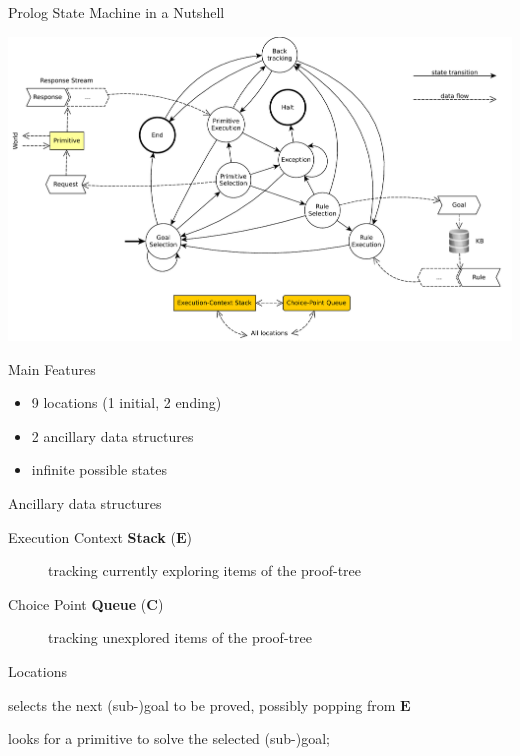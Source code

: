 \documentclass[handout]{beamer}
\begin{document}
\begin{frame}[allowframebreaks]{Prolog State Machine in a Nutshell}
    \begin{center}
        \includegraphics[width=.9\linewidth]{img/classic-sm.pdf}
    \end{center}

    \begin{block}{Main Features}
        \begin{itemize}
            \item 9 locations (1 initial, 2 ending)
            \item 2 ancillary data structures
            \item infinite possible states
        \end{itemize}
    \end{block}

    \begin{block}{Ancillary data structures}
        \begin{description}
            \item[Execution Context \textbf{Stack} ($\mathbf{E}$)] tracking currently exploring items of the proof-tree
            \item[Choice Point \textbf{Queue} ($\mathbf{C}$)] tracking unexplored items of the proof-tree
        \end{description}
    \end{block}

    \begin{block}{Locations}
        \begin{description}\small
            \item[Goal Selection] selects the next (sub-)goal to be proved, possibly popping from $\mathbf{E}$

            \item[Primitive Selection] looks for a primitive to solve the selected (sub-)goal;
            

\end{description}
\end{block}
\end{frame}
\end{document}
